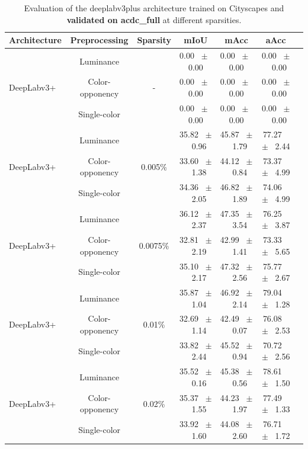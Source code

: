 \begin{table}[h]
  \centering
  \caption{Evaluation of the deeplabv3plus architecture trained on Cityscapes and \textbf{validated on acdc_full} at different sparsities.}
  \begin{tabular}{@{}lccc ccc@{}}
    \toprule
    Architecture & Preprocessing & Sparsity & mIoU & mAcc & aAcc \\
    \midrule
    \midrule
    \midrule
    \multirow{3}{*}{DeepLabv3+} & Luminance & \multirow{3}{*}{-} & 0.00 ~$\pm$~ 0.00 & 0.00 ~$\pm$~ 0.00 & 0.00 ~$\pm$~ 0.00 \\
    & Color-opponency & & 0.00 ~$\pm$~ 0.00 & 0.00 ~$\pm$~ 0.00 & 0.00 ~$\pm$~ 0.00 \\
    & Single-color & & 0.00 ~$\pm$~ 0.00 & 0.00 ~$\pm$~ 0.00 & 0.00 ~$\pm$~ 0.00 \\
    \midrule
    \multirow{3}{*}{DeepLabv3+} & Luminance & \multirow{3}{*}{0.005\%} & 35.82 ~$\pm$~ 0.96 & 45.87 ~$\pm$~ 1.79 & 77.27 ~$\pm$~ 2.44 \\
    & Color-opponency & & 33.60 ~$\pm$~ 1.38 & 44.12 ~$\pm$~ 0.84 & 73.37 ~$\pm$~ 4.99 \\
    & Single-color & & 34.36 ~$\pm$~ 2.05 & 46.82 ~$\pm$~ 1.89 & 74.06 ~$\pm$~ 4.99 \\
    \midrule
    \multirow{3}{*}{DeepLabv3+} & Luminance & \multirow{3}{*}{0.0075\%} & 36.12 ~$\pm$~ 2.37 & 47.35 ~$\pm$~ 3.54 & 76.25 ~$\pm$~ 3.87 \\
    & Color-opponency & & 32.81 ~$\pm$~ 2.19 & 42.99 ~$\pm$~ 1.41 & 73.33 ~$\pm$~ 5.65 \\
    & Single-color & & 35.10 ~$\pm$~ 2.17 & 47.32 ~$\pm$~ 2.56 & 75.77 ~$\pm$~ 2.67 \\
    \midrule
    \multirow{3}{*}{DeepLabv3+} & Luminance & \multirow{3}{*}{0.01\%} & 35.87 ~$\pm$~ 1.04 & 46.92 ~$\pm$~ 2.14 & 79.04 ~$\pm$~ 1.28 \\
    & Color-opponency & & 32.69 ~$\pm$~ 1.14 & 42.49 ~$\pm$~ 0.07 & 76.08 ~$\pm$~ 2.53 \\
    & Single-color & & 33.82 ~$\pm$~ 2.44 & 45.52 ~$\pm$~ 0.94 & 70.72 ~$\pm$~ 2.56 \\
    \midrule
    \multirow{3}{*}{DeepLabv3+} & Luminance & \multirow{3}{*}{0.02\%} & 35.52 ~$\pm$~ 0.16 & 45.38 ~$\pm$~ 0.56 & 78.61 ~$\pm$~ 1.50 \\
    & Color-opponency & & 35.37 ~$\pm$~ 1.55 & 44.23 ~$\pm$~ 1.97 & 77.49 ~$\pm$~ 1.33 \\
    & Single-color & & 33.92 ~$\pm$~ 1.60 & 44.08 ~$\pm$~ 2.60 & 76.71 ~$\pm$~ 1.72 \\
    \midrule
    \bottomrule
  \end{tabular}
  \label{tab:sparse_deeplabv3plus_acdc_full}
\end{table}